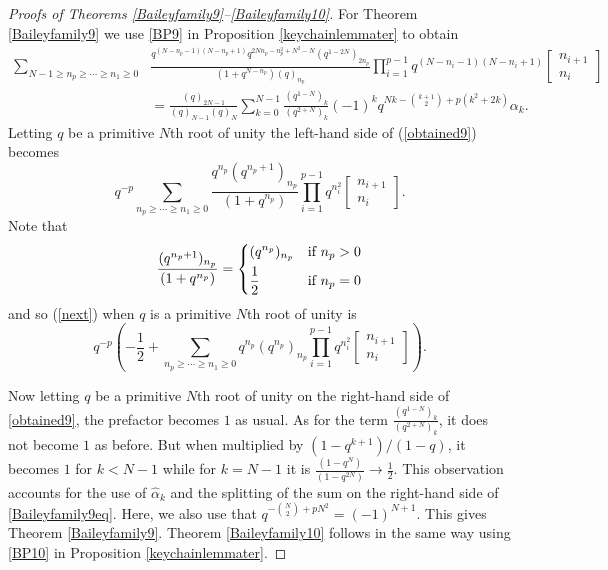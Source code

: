 \documentclass[11pt,reqno]{amsart}
\theoremstyle{definition}
\numberwithin{equation}{section}
\renewcommand{\=}{\;=\;}
\begin{document}
\begin{proof}[Proofs of Theorems \ref{Baileyfamily9}--\ref{Baileyfamily10}]
For Theorem \ref{Baileyfamily9} we use \eqref{BP9} in Proposition \ref{keychainlemmater} to obtain
\begin{equation} \label{obtained9}
\begin{aligned}
\sum_{N-1 \geq n_p \geq \cdots \geq n_1\geq 0}& \frac{q^{(N-n_p-1)(N-n_p+1)} q^{2Nn_p - n_p^2 + N^2-N}(q^{1-2N})_{2n_p}}{(1+q^{N-n_p})(q)_{n_p}} \prod_{i=1}^{p-1} q^{(N-n_i-1)(N-n_i+1)} \begin{bmatrix} n_{i+1} \\ n_i \end{bmatrix} \\
&= \frac{(q)_{2N-1}}{(q)_{N-1}(q)_{N}} \sum_{k=0}^{N-1} \frac{(q^{1-N})_k}{(q^{2+N})_k}(-1)^k q^{Nk -\binom{k+1}{2} + p(k^2+2k)} \alpha_k.
\end{aligned}
\end{equation} 
Letting $q$ be a primitive $N$th root of unity the left-hand side of (\ref{obtained9}) becomes 
\begin{equation} \label{next}
q^{-p}\sum_{n_p \geq \cdots \geq n_1 \geq 0} \frac{q^{n_p}(q^{n_p+1})_{n_p}}{(1+q^{n_p})} \prod_{i=1}^{p-1} q^{n_i^2} \begin{bmatrix} n_{i+1} \\ n_i \end{bmatrix}.
\end{equation}
Note that
\begin{equation}
\frac{(q^{n_p+1})_{n_p}}{(1+q^{n_p})} = 
\begin{dcases}
(q^{n_p})_{n_p} & \text{if $n_p > 0$} \\
\frac{1}{2} & \text{if $n_p = 0$}
\end{dcases}
\end{equation}
and so (\ref{next}) when $q$ is a primitive $N$th root of unity is
\begin{equation}
q^{-p}\left(-\frac{1}{2} + \sum_{n_p \geq \cdots \geq n_1 \geq 0} q^{n_p}(q^{n_p})_{n_p} \prod_{i=1}^{p-1} q^{n_i^2} \begin{bmatrix} n_{i+1} \\ n_i \end{bmatrix} \right).
\end{equation}

Now letting $q$ be a primitive $N$th root of unity on the right-hand side of \eqref{obtained9}, the prefactor becomes $1$ as usual.   As for the term $\frac{(q^{1-N})_k}{(q^{2+N})_k}$, it does not become $1$ as before.  But when multiplied by $(1-q^{k+1})/(1-q)$, it becomes $1$ for $k < N-1$ while for $k = N-1$ it is $\frac{(1-q^N)}{(1-q^{2N})} \to \frac{1}{2}$.   This observation accounts for the use of $\widehat{\alpha}_k$ and the splitting of the sum on the right-hand side of \eqref{Baileyfamily9eq}. Here, we also use that $q^{-\binom{N}{2} + pN^2} = (-1)^{N+1}$. This gives Theorem \ref{Baileyfamily9}.    Theorem \ref{Baileyfamily10} follows in the same way using \eqref{BP10} in Proposition \ref{keychainlemmater}.
\end{proof}
\end{document}
